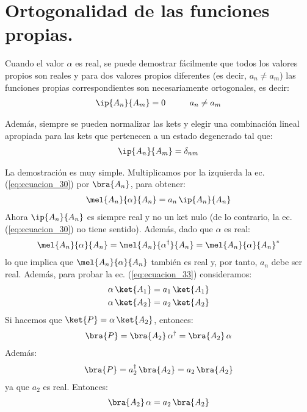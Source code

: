 \section{Ortogonalidad de las funciones propias.}

Cuando el valor $\alpha$ es real, se puede demostrar fácilmente que todos los valores propios son reales y para dos valores propios diferentes (es decir, $a_{n} \neq a_{m}$) las funciones propias correspondientes son necesariamente ortogonales, es decir:
\begin{align}
\ip{A_n}{A_{m}} = 0 \hspace{1cm} a_{n} \neq a_{m}
\label{eq:ecuacion_33}
\end{align}

Además, siempre se pueden normalizar las kets y elegir una combinación lineal apropiada para las kets que pertenecen a un estado degenerado tal que:
\begin{align}
\ip{A_{n}}{A_{m}} = \delta_{n m}
\label{eq:ecuacion_34}
\end{align}

La demostración es muy simple. Multiplicamos por la izquierda la ec. (\ref{eq:ecuacion_30}) por $\bra{A_{n}}$, para obtener:
\begin{align*}
\mel{A_{n}}{\alpha}{A_{n}} = a_{n} \, \ip{A_{n}}{A_{n}}
\end{align*}
Ahora $\ip{A_{n}}{A_{n}}$ es siempre real y no un ket nulo (de lo contrario, la ec. (\ref{eq:ecuacion_30}) no tiene
sentido). Además, dado que $\alpha$ es real:
\begin{align*}
\mel{A_{n}}{\alpha}{A_{n}} = \mel{A_{n}}{\alpha^{\dagger}}{A_{n}} = \mel{A_{n}}{\alpha}{A_{n}}^{*}
\end{align*}
lo que implica que $\mel{A_{n}}{\alpha}{A_{n}}$ también es real y, por tanto, $a_{n}$ debe ser real. Además, para probar la ec. (\ref{eq:ecuacion_33}) consideramos:
\begin{align}
\alpha \, \ket{A_{1}} &= a_{1} \, \ket{A_{1}} \label{eq:ecuacion_35} \\
\alpha \, \ket{A_{2}} &= a_{2} \, \ket{A_{2}} \label{eq:ecuacion_36}
\end{align}
Si hacemos que $\ket{P} = \alpha \, \ket{A_{2}}$, entonces:
\begin{align*}
\bra{P} = \bra{A_{2}} \, \alpha^{\dagger} = \bra{A_{2}} \, \alpha
\end{align*}
Además:
\begin{align*}
\bra{P} = a_{2}^{\dagger} \, \bra{A_{2}} = a_{2} \, \bra{A_{2}}
\end{align*}
ya que $a_{2}$ es real. Entonces:
\begin{align}
\bra{A_{2}} \, \alpha = a_{2} \, \bra{A_{2}}
\label{eq:ecuacion_37}
\end{align}


